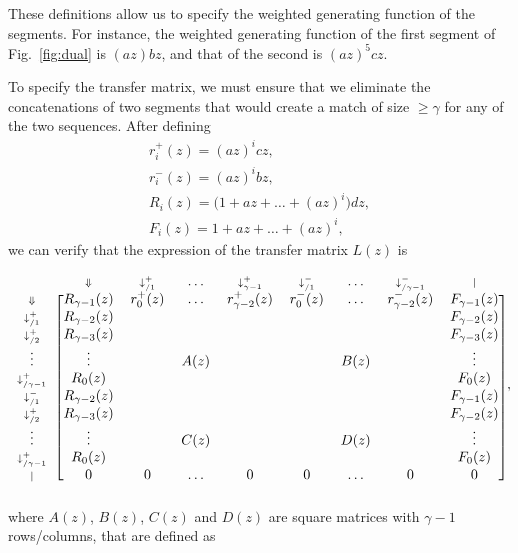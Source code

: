 \documentclass{article}
\begin{document}
These definitions allow us to specify the weighted generating function of
the segments. For instance, the weighted generating function of the
first segment of Fig.~\ref{fig:dual} is $(az)bz$, and that of the second is
$(az)^5cz$.

To specify the transfer matrix, we must ensure that we eliminate
the concatenations of two segments that would create a match of size $\geq
\gamma$ for any of the two sequences. After defining
\begin{equation*}
\begin{gathered}
r_i^+(z) = (az)^icz, \\
r_i^-(z) = (az)^ibz, \\
R_i(z) = \big( 1 + az + \ldots + (az)^i \big)dz, \\
F_i(z) = 1 + az + \ldots + (az)^i,
\end{gathered}
\end{equation*}
we can verify that the expression of the transfer matrix $L(z)$ is

\begin{equation*}
\begin{blockarray}{ccccccccc}
   & \scriptstyle{\Downarrow} & \scriptstyle{\downarrow_{/1}^+} & 
    \ldots & \scriptstyle{\downarrow_{\gamma-1}^+} &
    \scriptstyle{\downarrow_{/1}^-} & \ldots &
    \scriptstyle{\downarrow_{/\gamma-1}^-} & \scriptstyle{|} \\
\begin{block}{c[cccccccc]}
\scriptstyle{\Downarrow} & R_{\gamma-1}(z)  & r_0^+(z) & \ldots &
    r_{\gamma-2}^+(z) & r_0^-(z) & \ldots & r_{\gamma-2}^-(z) &
    F_{\gamma-1}(z) \\
\scriptstyle{\downarrow_{/1}^+} & R_{\gamma-2}(z) & & & & & & &
    F_{\gamma-2}(z) \\
\scriptstyle{\downarrow_{/2}^+} & R_{\gamma-3}(z) & & & & & & &
    F_{\gamma-3}(z) \\
\vdots & \vdots & & A(z) & & & B(z) & & \vdots \\
\scriptstyle{\downarrow_{/\gamma-1}^+} & R_0(z) & & & & & & & F_0(z) \\
\scriptstyle{\downarrow_{/1}^-} & R_{\gamma-2}(z) & & & & & & &
    F_{\gamma-1}(z) \\
\scriptstyle{\downarrow_{/2}^+} & R_{\gamma-3}(z) & & & & & & &
    F_{\gamma-2}(z) \\
\vdots & \vdots & & C(z) & & & D(z) & & \vdots \\
\scriptstyle{\downarrow_{/\gamma-1}^+} & R_0(z) & & & & & & & F_0(z) \\
\scriptstyle{|} & 0 & 0 & \ldots & 0 & 0 & \ldots & 0 & 0 \\
\end{block}
\end{blockarray},
\end{equation*}
where $A(z)$, $B(z)$, $C(z)$ and $D(z)$ are square matrices with
$\gamma-1$ rows/columns, that are defined as
\end{document}
